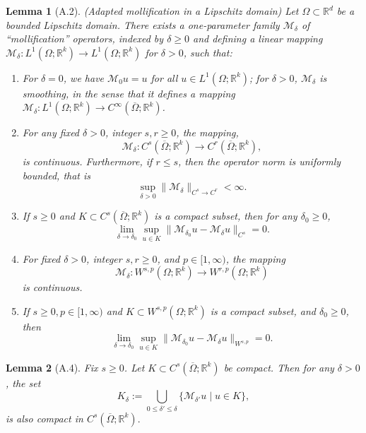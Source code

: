 \documentclass[reqno,9pt]{amsart}
\theoremstyle{plain}
\newtheorem{lem}{Lemma}
\theoremstyle{definition}
\newcommand{\bb}[1]{\mathbb{#1}}
\newcommand{\cal}[1]{\mathcal{#1}}
\begin{document}
\begin{lem}[A.2](Adapted mollification in a Lipschitz domain) \label{A.2}
    Let $\Omega \subset \bb R^d$ be a bounded Lipschitz domain. There exists a one-parameter family $\cal M_\delta$ of ``mollification'' operators, indexed by $\delta \geq 0$ and defining a linear mapping $\cal M_\delta :L^1(\Omega;\bb R^k) \to L^1(\Omega; \bb R^k)$ for $\delta > 0$, such that:
    \begin{enumerate}
        \item For $\delta = 0$, we have $\cal M_0u = u$ for all $u \in L^1(\Omega; \bb R^k)$; for $\delta > 0$, $\cal M_\delta$ is smoothing, in the sense that it defines a mapping $\cal M_\delta :L^1(\Omega;\bb R^k)\to C^\infty(\overline{\Omega};\bb R^k)$.
        \item For any fixed $\delta > 0$, integer $s,r \geq 0$, the mapping, $$ \cal M_\delta : C^s(\overline{\Omega};\bb R^k) \to C^r(\overline{\Omega};\bb R^k),$$ is continuous. Furthermore, if $r \leq s$, then the operator norm is uniformly bounded, that is $$\sup\limits_{\delta>0} \|\cal M_\delta\|_{C^s \to C^r} < \infty.$$
        \item If $s \geq 0$ and $K \subset C^s(\overline{\Omega};\bb R^k)$ is a compact subset, then for any $\delta_0 \geq 0$, $$ \lim_{\delta \to \delta_0} \sup_{u \in K} \|\cal M_{\delta_0} u - \cal M_\delta u\|_{C^s} = 0.$$
        \item For fixed $\delta > 0$, integer $s,r \geq 0$, and $p \in [1,\infty)$, the mapping $$\cal M_\delta : W^{s,p}(\Omega;\bb R^k) \to W^{r,p}(\Omega;\bb R^k)$$ is continuous.
        \item If $s \geq 0, p \in [1, \infty)$ and $K \subset W^{s,p}(\Omega;\bb R^k)$ is a compact subset, and $\delta_0 \geq 0$, then $$ \lim_{\delta \to \delta_0}\sup_{u \in K}\|\cal M_{\delta_0}u - \cal M_\delta u\|_{W^{s,p}} = 0.$$
    \end{enumerate}
\end{lem}
\begin{lem}[A.4]\label{A.4}
    Fix $s \geq 0$. Let $K \subset C^s(\overline{\Omega};\bb R^k)$ be compact. Then for any $\delta > 0$, the set 
    $$ K_\delta := \bigcup\limits_{0\leq \delta' \leq \delta} \{\cal M_{\delta'}u \mid u\in K\},$$
    is also compact in $C^s(\overline{\Omega};\bb R^k).$
\end{lem}
\end{document}
